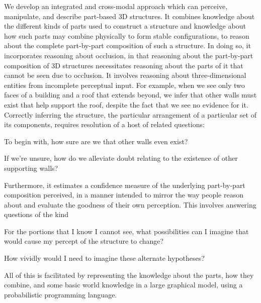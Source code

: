 We develop an integrated and cross-modal approach which can perceive,
manipulate, and describe part-based 3D structures.
%
It combines knowledge about the different kinds of parts used to construct a
structure and knowledge about how such parts may combine physically to form
stable configurations, to reason about the complete part-by-part composition
of such a structure.
%
In doing so, it incorporates reasoning about occlusion, in that reasoning
about the part-by-part composition of 3D structures necessitates reasoning
about the parts of it that cannot be seen due to occlusion.
%
It involves reasoning about three-dimensional entities from incomplete
perceptual input. For example, when we see only two faces of a building and a
roof that extends beyond, we infer that other walls must exist that help
support the roof, despite the fact that we see no evidence for it. Correctly
inferring the structure, the particular arrangement of a particular set of
its components, requires resolution of a host of related questions:
%
\begin{compactitem}\vspace{1ex}
\item To begin with, how sure are we that other walls even exist?
\item If we're unsure, how do we alleviate doubt relating to the existence of other
  supporting walls?
\end{compactitem}\vspace{1ex}
%
Furthermore, it estimates a confidence measure of the underlying part-by-part
composition perceived, in a manner intended to mirror the way people reason
about and evaluate the goodness of their own perception.
%
This involves answering questions of the kind
\begin{compactitem}\vspace{1ex}
\item For the portions that I know I cannot see, what possibilities can I
  imagine that would cause my percept of the structure to change?
\item How vividly would I need to imagine these alternate hypotheses?
\end{compactitem}\vspace{1ex}
%
All of this is facilitated by representing the knowledge about the
parts, how they combine, and some basic world knowledge in a large graphical
model, using a probabilistic programming language.

